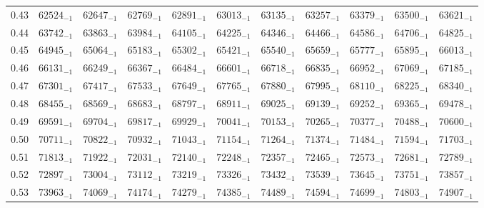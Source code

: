 \documentclass[10pt, a4paper]{article}
\begin{document}
\begin{center}
\begin{longtable}{c || c c c c c | c c c c c}
        0.43 & \({62524}_{-1}\) & \({62647}_{-1}\) & \({62769}_{-1}\) & \({62891}_{-1}\) & \({63013}_{-1}\) & \({63135}_{-1}\) & \({63257}_{-1}\) & \({63379}_{-1}\) & \({63500}_{-1}\) & \({63621}_{-1}\)\\
        0.44 & \({63742}_{-1}\) & \({63863}_{-1}\) & \({63984}_{-1}\) & \({64105}_{-1}\) & \({64225}_{-1}\) & \({64346}_{-1}\) & \({64466}_{-1}\) & \({64586}_{-1}\) & \({64706}_{-1}\) & \({64825}_{-1}\)\\
        0.45 & \({64945}_{-1}\) & \({65064}_{-1}\) & \({65183}_{-1}\) & \({65302}_{-1}\) & \({65421}_{-1}\) & \({65540}_{-1}\) & \({65659}_{-1}\) & \({65777}_{-1}\) & \({65895}_{-1}\) & \({66013}_{-1}\)\\
        0.46 & \({66131}_{-1}\) & \({66249}_{-1}\) & \({66367}_{-1}\) & \({66484}_{-1}\) & \({66601}_{-1}\) & \({66718}_{-1}\) & \({66835}_{-1}\) & \({66952}_{-1}\) & \({67069}_{-1}\) & \({67185}_{-1}\)\\
        0.47 & \({67301}_{-1}\) & \({67417}_{-1}\) & \({67533}_{-1}\) & \({67649}_{-1}\) & \({67765}_{-1}\) & \({67880}_{-1}\) & \({67995}_{-1}\) & \({68110}_{-1}\) & \({68225}_{-1}\) & \({68340}_{-1}\)\\
        0.48 & \({68455}_{-1}\) & \({68569}_{-1}\) & \({68683}_{-1}\) & \({68797}_{-1}\) & \({68911}_{-1}\) & \({69025}_{-1}\) & \({69139}_{-1}\) & \({69252}_{-1}\) & \({69365}_{-1}\) & \({69478}_{-1}\)\\
        0.49 & \({69591}_{-1}\) & \({69704}_{-1}\) & \({69817}_{-1}\) & \({69929}_{-1}\) & \({70041}_{-1}\) & \({70153}_{-1}\) & \({70265}_{-1}\) & \({70377}_{-1}\) & \({70488}_{-1}\) & \({70600}_{-1}\)\\
        \hline
        0.50 & \({70711}_{-1}\) & \({70822}_{-1}\) & \({70932}_{-1}\) & \({71043}_{-1}\) & \({71154}_{-1}\) & \({71264}_{-1}\) & \({71374}_{-1}\) & \({71484}_{-1}\) & \({71594}_{-1}\) & \({71703}_{-1}\)\\
        0.51 & \({71813}_{-1}\) & \({71922}_{-1}\) & \({72031}_{-1}\) & \({72140}_{-1}\) & \({72248}_{-1}\) & \({72357}_{-1}\) & \({72465}_{-1}\) & \({72573}_{-1}\) & \({72681}_{-1}\) & \({72789}_{-1}\)\\
        0.52 & \({72897}_{-1}\) & \({73004}_{-1}\) & \({73112}_{-1}\) & \({73219}_{-1}\) & \({73326}_{-1}\) & \({73432}_{-1}\) & \({73539}_{-1}\) & \({73645}_{-1}\) & \({73751}_{-1}\) & \({73857}_{-1}\)\\
        0.53 & \({73963}_{-1}\) & \({74069}_{-1}\) & \({74174}_{-1}\) & \({74279}_{-1}\) & \({74385}_{-1}\) & \({74489}_{-1}\) & \({74594}_{-1}\) & \({74699}_{-1}\) & \({74803}_{-1}\) & \({74907}_{-1}\)\\

\end{longtable}
\end{center}
\end{document}

